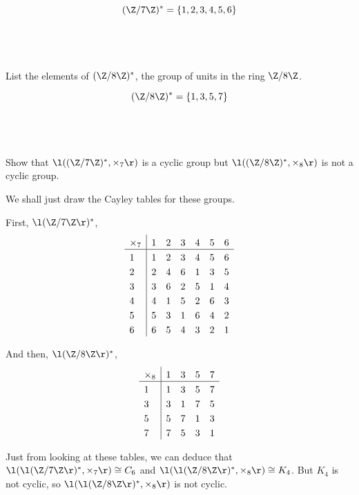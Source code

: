 \documentclass[a4paper]{article}
\begin{document}
$$(\Z / 7\Z)^* = \{1, 2, 3, 4, 5, 6\}$$

\subsection{~} %

\begin{questionbody}
List the elements of $(\Z / 8\Z)^*$, the group of units in the ring $\Z / 8\Z$.
\end{questionbody}

$$(\Z / 8\Z)^* = \{1, 3, 5, 7\}$$

\subsection{~} %

\begin{questionbody}
Show that $\l( (\Z / 7\Z)^*, \times_7 \r)$ is a cyclic group but $\l( (\Z / 8\Z)^*, \times_8 \r)$ is not a cyclic group.
\end{questionbody}

We shall just draw the Cayley tables for these groups.

First, $\l(\Z / 7\Z\r)^*$,
\[
\setlength{\extrarowheight}{3pt}%
\begin{array}{l|*{6}{l}}
	\times_7 & 1 & 2 & 3 & 4 & 5 & 6 \\
\hline
	1 & 1 & 2 & 3 & 4 & 5 & 6 \\
	2 & 2 & 4 & 6 & 1 & 3 & 5 \\
	3 & 3 & 6 & 2 & 5 & 1 & 4 \\
	4 & 4 & 1 & 5 & 2 & 6 & 3 \\
	5 & 5 & 3 & 1 & 6 & 4 & 2 \\
	6 & 6 & 5 & 4 & 3 & 2 & 1
\end{array}
\]

And then, $\l(\Z / 8\Z\r)^*$,
\[
\setlength{\extrarowheight}{3pt}%
\begin{array}{l|*{7}{l}}
	\times_8 & 1 & 3 & 5 & 7 \\
\hline
	1 & 1 & 3 & 5 & 7 \\
	3 & 3 & 1 & 7 & 5 \\
	5 & 5 & 7 & 1 & 3 \\
	7 & 7 & 5 & 3 & 1 \\
\end{array}
\]

Just from looking at these tables, we can deduce that $\l( \l(\Z / 7 \Z\r)^*, \times_7 \r) \cong C_6$ and $\l( \l(\Z / 8 \Z\r)^*, \times_8 \r) \cong K_4$. But $K_4$ is not cyclic, so $\l( \l(\Z / 8 \Z\r)^*, \times_8 \r)$ is not cyclic.
\end{document}
